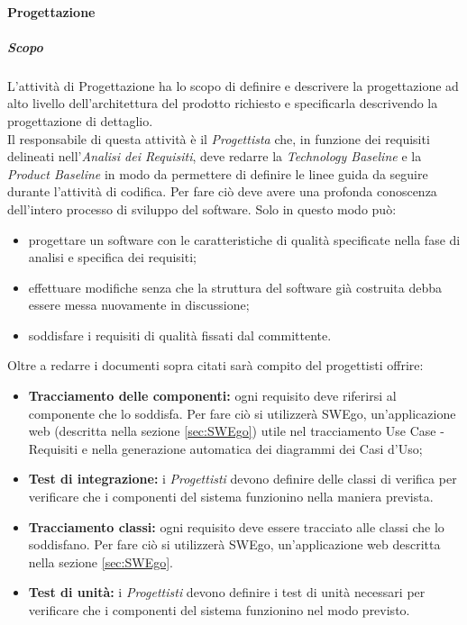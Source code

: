 		\paragraph{Progettazione}
			\subparagraph{Scopo}
			\Spazio
			L'attività di Progettazione ha lo scopo di definire e descrivere la progettazione ad alto livello dell'architettura del prodotto richiesto e specificarla descrivendo la progettazione di dettaglio. \\
			Il responsabile di questa attività è il \emph{Progettista} che, in funzione dei requisiti delineati nell'\textit{Analisi dei Requisiti}, deve redarre la \textit{Technology Baseline} e la \textit{Product Baseline} in modo da permettere di definire le linee guida da seguire durante l'attività di codifica.
			Per fare ciò deve avere una profonda conoscenza dell'intero processo di sviluppo del software.
			Solo in questo modo può:
			\begin{itemize}
				\item progettare un software con le caratteristiche di qualità specificate nella fase di analisi e specifica dei requisiti;
				\item effettuare modifiche senza che la struttura del software già costruita debba essere messa nuovamente in discussione;
				\item soddisfare i requisiti di qualità fissati dal committente.
			\end{itemize}
			Oltre a redarre i documenti sopra citati sarà compito del progettisti offrire:
			\begin{itemize}
				\item \textbf{Tracciamento delle componenti:}
				ogni requisito deve riferirsi al componente che lo soddisfa. Per fare ciò si utilizzerà SWEgo, un'applicazione web (descritta nella sezione \ref{sec:SWEgo}) utile nel tracciamento Use Case - Requisiti e nella generazione automatica dei diagrammi dei Casi d'Uso;
				\item \textbf{Test di integrazione:}
				i \emph{Progettisti} devono definire delle classi di verifica per verificare che i componenti del sistema funzionino nella maniera prevista.	
				\item \textbf{Tracciamento classi:}
				ogni requisito deve essere tracciato alle classi che lo soddisfano. Per fare ciò si utilizzerà SWEgo, un'applicazione web descritta nella sezione \ref{sec:SWEgo}.
				\item \textbf{Test di unità:}
				i \emph{Progettisti} devono definire i test di unità necessari per verificare che i componenti del sistema funzionino nel modo previsto.
			\end{itemize}
		
